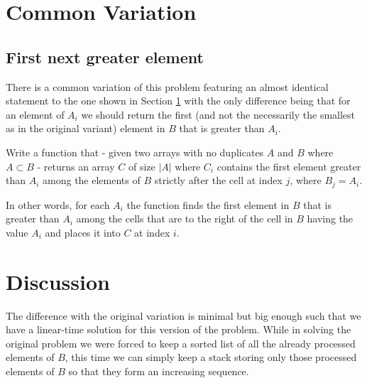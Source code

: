 

\section{Common Variation}
\subsection{First next greater element}
\label{next_greater_element:sec:first}
There is a common variation of this problem featuring an almost identical statement to the one shown
in Section \ref{} with the only difference being that for an element of $A_i$ we should return the
first (and not the necessarily the smallest as in the original variant) element in $B$ that is
greater than $A_i$.

\begin{exercise}
	\label{example:next_greater_element:exercice2}
	Write a function that -  given two arrays with no duplicates $A$ and $B$ where $A \subset B$ - 
	returns an array $C$ of size $|A|$ where $C_i$ contains the first element greater than $A_i$
	among the elements of $B$ strictly after the cell at index $j$, where $B_j = A_i$.
	
	In other words, for each $A_i$ the function finds the first element in $B$ that is greater than
	$A_i$ among the cells that are to the right of the cell in $B$ having the value $A_i$ and places
	it into $C$ at index $i$.

\end{exercise}

\section{Discussion}
\label{next_greater_element:sec:variation1:discussion}
The difference with the original variation is minimal but big enough such that we have a
linear-time solution for this version of the problem. While in solving the original problem  we were forced to keep a
sorted list of all the already processed elements of $B$, this time we can simply keep a stack
storing only those processed elements of $B$ so that they form an increasing sequence.


